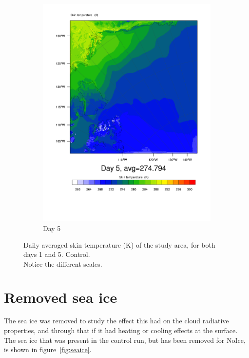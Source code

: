 \begin{figure}
\begin{subfigure}{0.48\textwidth}
		\centering
		\includegraphics[width=\textwidth]{results/control/skintemp_day5.pdf}
		\caption{Day 5}
		\label{subfig:skin_r1Day5}
	\end{subfigure}
	\caption{Daily averaged skin temperature (K) of the study area, for both days 1 and 5. Control.\\Notice the different scales.}
	\label{fig:skintemp}
\end{figure}

\clearpage
\section{Removed sea ice}
The sea ice was removed to study the effect this had on the cloud radiative properties, and through that if it had heating or cooling effects at the surface. The sea ice that was present in the control run, but has been removed for NoIce, is shown in figure~\ref{fig:seaice}. 

